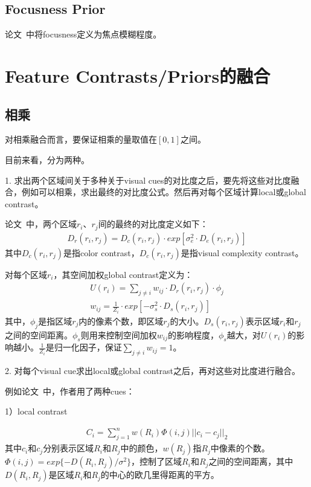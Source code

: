 \documentclass[12pt]{article}
\begin{document}
\subsection{Focusness Prior}

论文~\cite{jiangpeng2013salient}中将focusness定义为焦点模糊程度。

\section{Feature Contrasts/Priors的融合}

\subsection{相乘}

对相乘融合而言，要保证相乘的量取值在$[0, 1]$之间。

目前来看，分为两种。

1. 求出两个区域间关于多种关于visual cues的对比度之后，要先将这些对比度融合，例如可以相乘，求出最终的对比度公式。然后再对每个区域计算local或global contrast。

论文~\cite{zhu2014tag}中，两个区域$r_i$、$r_j$间的最终的对比度定义如下：
\begin{align}
D_r(r_i, r_j) = D_c(r_i, r_j) \cdot exp[\sigma_e^2 \cdot D_e(r_i, r_j)]
\end{align}
其中$D_c(r_i, r_j)$是指color contrast，$D_c(r_i, r_j)$是指visual complexity contrast。

对每个区域$r_i$，其空间加权global contrast定义为：
\begin{align}
U(r_i) = \sum_{j\ne i}w_{ij} \cdot D_r(r_i, r_j) \cdot \phi_j\\
w_{ij} = \frac{1}{Z_i}\cdot exp[-\sigma_s^2 \cdot D_s(r_i, r_j)]
\end{align}
其中，$\phi_j$是指区域$r_j$内的像素个数，即区域$r_j$的大小。$D_s(r_i, r_j)$表示区域$r_i$和$r_j$之间的空间距离。$\phi_s$则用来控制空间加权$w_{ij}$的影响程度，$\phi_s$越大，对$U(r_i)$的影响越小。$\frac{1}{Z_i}$是归一化因子，保证$\sum_{j \ne i}w_{ij} = 1$。

2. 对每个visual cue求出local或global contrast之后，再对这些对比度进行融合。

例如论文~\cite{yan2013hierarchical}中，作者用了两种cues：

1）local contrast

\begin{align}
C_i = \sum_{j=1}^{n}w(R_i)\Phi(i, j)||c_i-c_j||_2
\end{align}
其中$c_i$和$c_j$分别表示区域$R_i$和$R_j$中的颜色，$w(R_j)$指$R_j$中像素的个数。$\Phi(i, j) = exp\{-D(R_i, R_j)/\sigma^2\}$，控制了区域$R_i$和$R_j$之间的空间距离，其中$D(R_i, R_j)$是区域$R_i$和$R_j$的中心的欧几里得距离的平方。
\end{document}
